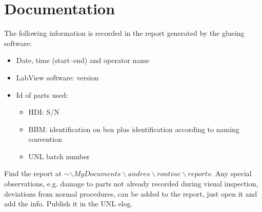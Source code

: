 \documentclass[12pt]{unlsilabsop}
\begin{document}
\section{Documentation}
The following information is recorded in the report generated by the glueing software:
\begin{itemize}
    \item Date, time (start--end) and operator name
    \item LabView software: version
    \item Id of parts used:
	\begin{itemize}
	    \item HDI: S/N
	    \item BBM: identification on box plus identification according to naming convention
	    \item UNL batch number
	\end{itemize}
\end{itemize}

Find the report at $\sim\backslash MyDocuments\backslash andres\backslash routine\backslash reports$. Any special observations, e.g. damage to parts not already recorded during visual inspection, deviations from normal procedures, can be added to the report, just open it  and add the info. Publish it in the UNL elog. 
\end{document}
